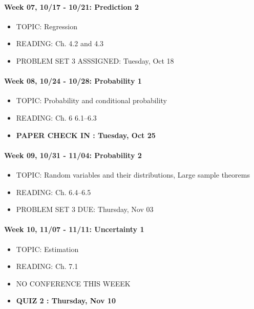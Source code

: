 \documentclass[11pt,]{article}
\begin{document}
\paragraph{Week 07, 10/17 - 10/21: Prediction
2}\label{week-07-1017---1021-prediction-2}

\begin{itemize}
\itemsep1pt\parskip0pt
\item
  TOPIC: Regression
\item
  READING: Ch. 4.2 and 4.3
\item
  PROBLEM SET 3 ASSSIGNED: Tuesday, Oct 18
\end{itemize}

\paragraph{Week 08, 10/24 - 10/28: Probability
1}\label{week-08-1024---1028-probability-1}

\begin{itemize}
\itemsep1pt\parskip0pt
\item
  TOPIC: Probability and conditional probability
\item
  READING: Ch. 6 6.1--6.3
\item
  \textbf{PAPER CHECK IN : Tuesday, Oct 25 }
\end{itemize}

\paragraph{Week 09, 10/31 - 11/04: Probability
2}\label{week-09-1031---1104-probability-2}

\begin{itemize}
\itemsep1pt\parskip0pt
\item
  TOPIC: Random variables and their distributions, Large sample theorems
\item
  READING: Ch. 6.4--6.5
\item
  PROBLEM SET 3 DUE: Thursday, Nov 03
\end{itemize}

\paragraph{Week 10, 11/07 - 11/11: Uncertainty
1}\label{week-10-1107---1111-uncertainty-1}

\begin{itemize}
\itemsep1pt\parskip0pt
\item
  TOPIC: Estimation
\item
  READING: Ch. 7.1
\item
  NO CONFERENCE THIS WEEEK
\item
  \textbf{QUIZ 2 : Thursday, Nov 10 }
\end{itemize}
\end{document}
